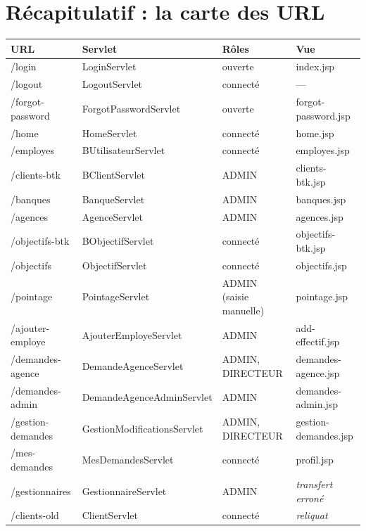 \section{Récapitulatif : la carte des URL}

\noindent\begin{longtable}{|>{\ttfamily\small}L{3.3cm}|>{\small}L{3.9cm}|>{\small}L{3.1cm}|>{\small}L{4.1cm}|}
\hline
{}
\textmd{\textbf{URL}} & \textbf{Servlet} & \textbf{Rôles} & \textbf{Vue}\\
\hline
\endhead
/login & LoginServlet & ouverte & index.jsp\\
\hline
/logout & LogoutServlet & connecté & ---\\
\hline
/forgot-password & ForgotPasswordServlet & ouverte & forgot-password.jsp\\
\hline
/home & HomeServlet & connecté & home.jsp\\
\hline
/employes & BUtilisateurServlet & connecté & employes.jsp\\
\hline
/clients-btk & BClientServlet & ADMIN & clients-btk.jsp\\
\hline
/banques & BanqueServlet & ADMIN & banques.jsp\\
\hline
/agences & AgenceServlet & ADMIN & agences.jsp\\
\hline
/objectifs-btk & BObjectifServlet & connecté & objectifs-btk.jsp\\
\hline
/objectifs & ObjectifServlet & connecté & objectifs.jsp\\
\hline
/pointage & PointageServlet & ADMIN (saisie manuelle) & pointage.jsp\\
\hline
/ajouter-employe & AjouterEmployeServlet & ADMIN & add-effectif.jsp\\
\hline
/demandes-agence & DemandeAgenceServlet & ADMIN, DIRECTEUR & demandes-agence.jsp\\
\hline
/demandes-admin & DemandeAgenceAdminServlet & ADMIN & demandes-admin.jsp\\
\hline
/gestion-demandes & GestionModificationsServlet & ADMIN, DIRECTEUR & gestion-demandes.jsp\\
\hline
/mes-demandes & MesDemandesServlet & connecté & profil.jsp\\
\hline
/gestionnaires & GestionnaireServlet & ADMIN & \textit{transfert erroné}\\
\hline
/clients-old & ClientServlet & connecté & \textit{reliquat}\\
\hline
\end{longtable}
